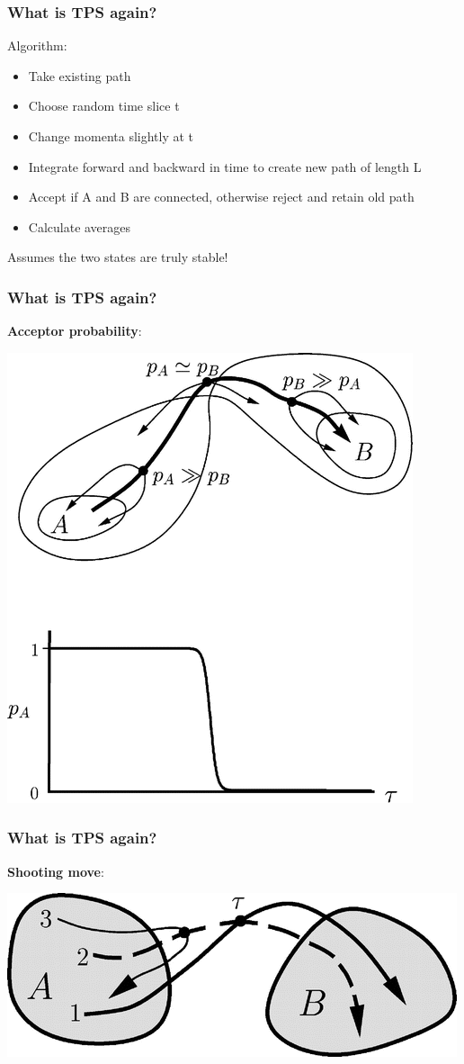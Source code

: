\documentclass[hyperref={pdfpagelabels=false}]{beamer}
\begin{document}
\begin{frame}
\frametitle{What is TPS again?}
Algorithm:
\begin{itemize}
\item Take existing path
\item Choose random time slice t
\item Change momenta slightly at t
\item Integrate forward and backward in time to create new path of length L
\item Accept if A and B are connected, otherwise reject and retain old path
\item Calculate averages
\end{itemize}
Assumes the two states are truly stable!
\end{frame}

\begin{frame}
\frametitle{What is TPS again?}
\textbf{Acceptor probability}:
\begin{center}
\includegraphics[scale=0.4]{images/bolhuis1.png}
\end{center}
\end{frame}

\begin{frame}
\frametitle{What is TPS again?}
\textbf{Shooting move}:
\begin{center}
\includegraphics[scale=0.5]{images/bolhuis2.png}
\end{center}
\end{frame}
\end{document}
